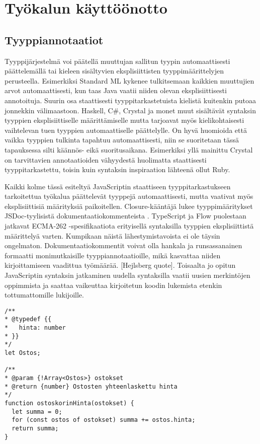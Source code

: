 \chapter{Työkalun käyttöönotto}

\section{Tyyppiannotaatiot}

Tyyppijärjestelmä voi päätellä muuttujan sallitun tyypin automaattisesti
päättelemällä tai kieleen sisältyvien eksplisiittisten tyyppimäärittelyjen
perusteella. Esimerkiksi Standard ML kykenee tulkitsemaan kaikkien muuttujien
arvot automaattisesti, kun taas Java vaatii niiden olevan eksplisiittisesti
annotoituja. Suurin osa staattisesti tyyppitarkastetuista kielistä kuitenkin
putoaa jonnekkin välimaastoon. Haskell, C\#, Crystal ja monet muut sisältävät
syntaksin tyyppien eksplisiittiselle määrittämiselle mutta tarjoavat myös
kielikohtaisesti vaihtelevan tuen tyyppien automaattiselle päättelylle.
On hyvä huomioida että vaikka tyyppien tulkinta tapahtuu automaattisesti,
niin se suoritetaan tässä tapauksessa silti käännös- eikä suoritusaikana.
Esimerkiksi yllä mainittu Crystal on tarvittavien annotaatioiden vähyydestä
huolimatta staattisesti tyyppitarkastettu, toisin kuin syntaksin inspiraation
lähteenä ollut Ruby.

Kaikki kolme tässä esiteltyä JavaScriptin staattiseen tyyppitarkastukseen
tarkoitettua työkalua päättelevät tyyppejä automaattisesti, mutta vaativat
myös eksplisiittisiä määrityksiä paikoitellen. Closure-kääntäjä lukee
tyyppimääritykset JSDoc-tyylisistä dokumentaatiokommenteista \cite{annotatingJSforClosure}.
TypeScript ja Flow puolestaan jatkavat ECMA-262 -spesifikaatiota erityisellä syntaksilla
tyyppien eksplisiittistä määrittelyä varten. Kumpikaan näistä
lähestymistavoista ei ole täysin ongelmaton. Dokumentaatiokommentit voivat
olla hankala ja runsassanainen formaatti monimutkaisille tyyppiannotaatioille,
mikä kasvattaa niiden kirjoittamiseen vaadittua työmäärää. [Hejlsberg quote].
Toisaalta jo opitun JavaScriptin syntaksin jatkaminen uudella syntaksilla
vaatii uusien merkintöjen oppimmista ja saattaa vaikeuttaa kirjoitetun koodin
lukemista etenkin tottumattomille lukijoille.

\begin{minipage}{\linewidth}
\begin{lstlisting}[caption=Esimerkki Closure-annotaatiosta funktiolle]
/**
* @typedef {{
*   hinta: number
* }}
*/
let Ostos;

/**
* @param {!Array<Ostos>} ostokset
* @return {number} Ostosten yhteenlaskettu hinta
*/
function ostoskorinHinta(ostokset) {
  let summa = 0;
  for (const ostos of ostokset) summa += ostos.hinta;
  return summa;
}
\end{lstlisting}
\end{minipage}

